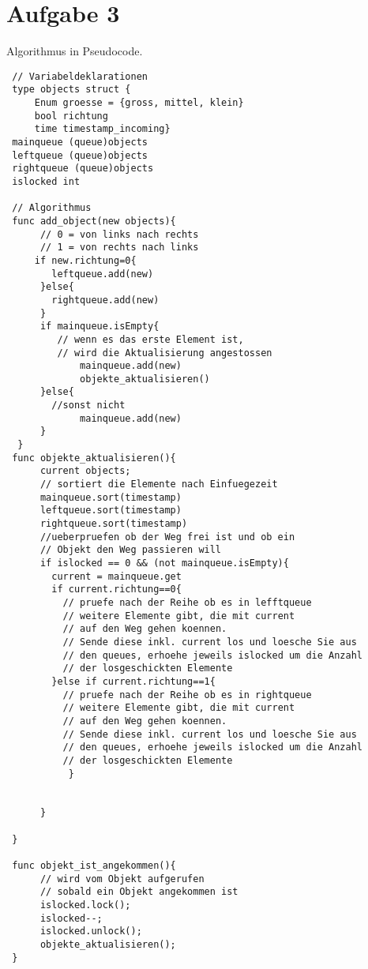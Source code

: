 \documentclass[11pt,a4paper,DIV=10,]{scrartcl}
\begin{document}
\section*{Aufgabe 3}
Algorithmus in Pseudocode.
\begin{lstlisting}
 // Variabeldeklarationen
 type objects struct {
     Enum groesse = {gross, mittel, klein}
     bool richtung
     time timestamp_incoming}
 mainqueue (queue)objects
 leftqueue (queue)objects
 rightqueue (queue)objects
 islocked int
 
 // Algorithmus
 func add_object(new objects){
      // 0 = von links nach rechts
      // 1 = von rechts nach links 
     if new.richtung=0{
	    leftqueue.add(new)
      }else{
	    rightqueue.add(new)
      }
      if mainqueue.isEmpty{
	     // wenn es das erste Element ist,
	     // wird die Aktualisierung angestossen
             mainqueue.add(new)
             objekte_aktualisieren()
      }else{
	    //sonst nicht
             mainqueue.add(new)
      }
  }
 func objekte_aktualisieren(){
      current objects;
      // sortiert die Elemente nach Einfuegezeit
      mainqueue.sort(timestamp)
      leftqueue.sort(timestamp)
      rightqueue.sort(timestamp)
      //ueberpruefen ob der Weg frei ist und ob ein 
      // Objekt den Weg passieren will
      if islocked == 0 && (not mainqueue.isEmpty){
	    current = mainqueue.get
	    if current.richtung==0{
		  // pruefe nach der Reihe ob es in lefftqueue 
		  // weitere Elemente gibt, die mit current
		  // auf den Weg gehen koennen. 
		  // Sende diese inkl. current los und loesche Sie aus 
		  // den queues, erhoehe jeweils islocked um die Anzahl
		  // der losgeschickten Elemente
	    }else if current.richtung==1{
		  // pruefe nach der Reihe ob es in rightqueue 
		  // weitere Elemente gibt, die mit current
		  // auf den Weg gehen koennen. 
		  // Sende diese inkl. current los und loesche Sie aus 
		  // den queues, erhoehe jeweils islocked um die Anzahl
		  // der losgeschickten Elemente
           }
	    
	    
      }
 
 }
 
 func objekt_ist_angekommen(){
      // wird vom Objekt aufgerufen
      // sobald ein Objekt angekommen ist
      islocked.lock();
      islocked--;
      islocked.unlock();
      objekte_aktualisieren();
 }
      
 
\end{lstlisting}
\end{document}

